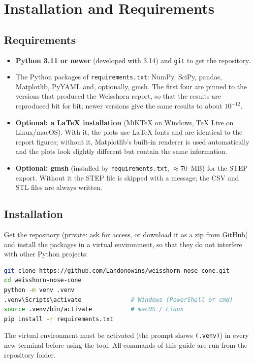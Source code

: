 \section{Installation and Requirements}
\label{sec:install}

\subsection{Requirements}

\begin{itemize}[leftmargin=*,itemsep=1pt]
\item \textbf{Python 3.11 or newer} (developed with 3.14) and \texttt{git} to get the repository.
\item The Python packages of \texttt{requirements.txt}: NumPy, SciPy, pandas, Matplotlib, PyYAML and, optionally,
gmsh. The first four are pinned to the versions that produced the Weisshorn report, so that the results are
reproduced bit for bit; newer versions give the same results to about $10^{-12}$.
\item \textbf{Optional: a LaTeX installation} (MiKTeX on Windows, TeX Live on Linux/macOS). With it, the plots use
LaTeX fonts and are identical to the report figures; without it, Matplotlib's built-in renderer is used
automatically and the plots look slightly different but contain the same information.
\item \textbf{Optional: gmsh} (installed by \texttt{requirements.txt}, $\approx$\SI{70}{MB}) for the STEP export.
Without it the STEP file is skipped with a message; the CSV and STL files are always written.
\end{itemize}

\subsection{Installation}

Get the repository (private: ask for access, or download it as a zip from GitHub) and install the packages in a
virtual environment, so that they do not interfere with other Python projects:
\begin{lstlisting}[language=bash]
git clone https://github.com/Landonowins/weisshorn-nose-cone.git
cd weisshorn-nose-cone
python -m venv .venv
.venv\Scripts\activate              # Windows (PowerShell or cmd)
source .venv/bin/activate           # macOS / Linux
pip install -r requirements.txt
\end{lstlisting}
The virtual environment must be activated (the prompt shows \texttt{(.venv)}) in every new terminal before using
the tool. All commands of this guide are run from the repository folder.

